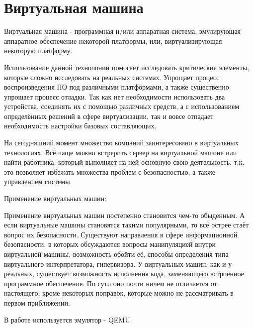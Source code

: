 \section{Виртуальная машина}

Виртуальная машина - программная и/или аппаратная система,
	эмулирующая аппаратное обеспечение некоторой платформы,
	или, виртуализирующая некоторую платформу.

Использование данной технолонии помогает исследовать критические элементы,
	которые сложно исследовать на реальных системах.
Упрощает процесс воспроизведения ПО под различными платформами,
	а также существенно упрощает процесс отладки.
Так как нет необходимости использовать два устройства,
	соединять их с помощью различных средств,
	а с использованием определённых решений в сфере виртуализации,
	так и вовсе отпадает необходимость настройки базовых составляющих.

На сегодняшний момент множество компаний заинтересовано в виртуальных технологиях. Всё чаще можно встрерить сервер на виртуальной машине или найти работника, который выполняет на ней основную свою деятельность, т.к. это позволяет избежать множества проблем с безопасностью, а также управлением системы. 

Применение виртуальных машин:


Применение виртуальных машин постепенно становится чем-то обыденным. 
А если виртуальные машины становятся такими популярными,
	то всё острее стаёт вопрос их безопасности.
Существуют направления в сфере информационной безопасности,
	в которых обсуждаются вопросы манипуляцией внутри виртуальной машины,
	возможность обойти её,
	способы определения типа виртуального интерпретатора, гипервизора.
У виртуальных машин, как и у реальных,
	существует возможность исполнения кода,
	заменяющего встроенное программное обеспечение.
По сути оно почти ничем не отличается от настоящего,
	кроме некоторых поправок,
		которые можно не рассматривать в первом приближении.

В работе используется эмулятор - QEMU\cite{proj:QEMU}.
